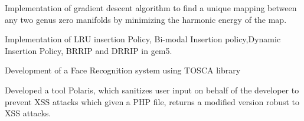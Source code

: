 \documentclass[hidelinks,letterpaper]{deedy-resume-openfont} %
\begin{document}
\begin{minipage}[t]{0.66\textwidth}
\small Implementation of gradient descent algorithm to find a unique mapping between any two genus zero manifolds by minimizing the harmonic energy of the map.

\small Implementation of LRU insertion Policy, Bi-modal Insertion policy,Dynamic Insertion Policy, BRRIP and DRRIP in gem5.

\small Development of a Face Recognition system using TOSCA library


\small Developed a tool Polaris, which sanitizes user input on behalf of the developer to prevent XSS attacks which given a PHP file, returns a modified version robust to XSS attacks.









\end{minipage} %

\end{document}
